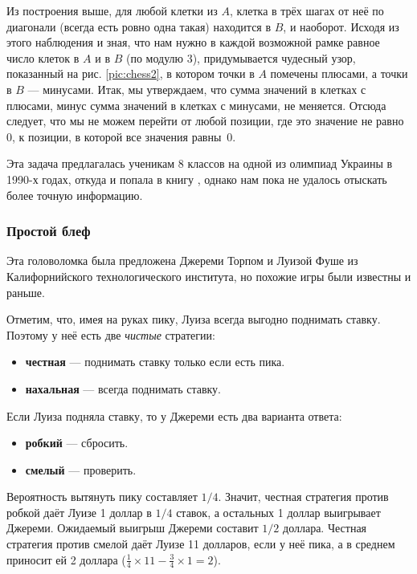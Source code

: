 Из построения выше, для любой клетки из $A$, клетка в трёх шагах от неё по диагонали (всегда есть ровно одна такая) находится в $B$, и наоборот.
Исходя из этого наблюдения и зная, что нам нужно в каждой возможной рамке равное число клеток в $A$ и в $B$ (по модулю 3), придумывается чудесный узор, показанный на рис. \ref{pic:chess2}, в котором точки в $A$ помечены плюсами, а точки в $B$ --- минусами.
Итак, мы утверждаем, что сумма значений в клетках с плюсами, минус сумма значений в клетках с минусами, не меняется.
Отсюда следует, что мы не можем перейти от любой позиции, где это значение не равно $0$, к позиции, в которой все значения равны~$0$.

\begin{addedbytheeditors}
  Эта задача предлагалась ученикам 8 классов на одной из олимпиад Украины в 1990-х годах, откуда и попала в книгу \cite{markova}, однако нам пока не удалось отыскать более точную информацию.  
\end{addedbytheeditors}

\subsubsection*{Простой блеф}

Эта головоломка была предложена Джереми Торпом и Луизой Фуше из Калифорнийского технологического института, но похожие игры были известны и раньше.

Отметим, что, имея на руках пику, Луиза всегда выгодно поднимать ставку.
Поэтому у неё есть две \emph{чистые} стратегии:
\begin{itemize}
 \item \textbf{честная} --- поднимать ставку только если есть пика.
 \item \textbf{нахальная} --- всегда поднимать ставку.
\end{itemize}
Если Луиза подняла ставку, то у Джереми есть два варианта ответа:
\begin{itemize}
 \item \textbf{робкий} --- сбросить.
 \item \textbf{смелый} --- проверить.
\end{itemize}

Вероятность вытянуть пику составляет $1/4$.
Значит, честная стратегия против робкой даёт Луизе 1 доллар в $1/4$ ставок, а остальных 1 доллар выигрывает Джереми.
Ожидаемый выигрыш Джереми составит $1/2$ доллара.
Честная стратегия против смелой даёт Луизе 11 долларов, если у неё пика,
а в среднем приносит ей 2 доллара ($\tfrac14 \times 11 - \tfrac 34 \times 1 = 2$).

